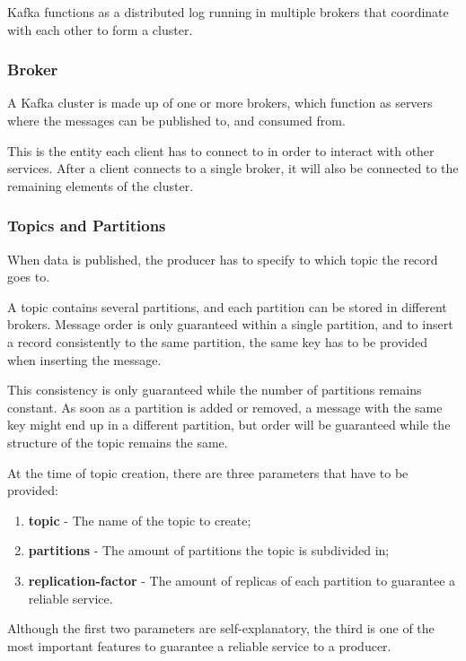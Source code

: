 Kafka functions as a distributed log running in multiple brokers that coordinate with each other to form a cluster.

\subsubsection{Broker}

A Kafka cluster is made up of one or more brokers, which function as servers where the messages can be published to, and consumed from.

This is the entity each client has to connect to in order to interact with other services. After a client connects to a single broker, it will also be connected to the remaining elements of the cluster.

\subsubsection{Topics and Partitions}

When data is published, the producer has to specify to which topic the record goes to. 

A topic contains several partitions, and each partition can be stored in different brokers. Message order is only guaranteed within a single partition, and to insert a record consistently to the same partition, the same key has to be provided when inserting the message. 

This consistency is only guaranteed while the number of partitions remains constant. As soon as a partition is added or removed, a message with the same key might end up in a different partition, but order will be guaranteed while the structure of the topic remains the same.

At the time of topic creation, there are three parameters that have to be provided: 
\begin{enumerate}
    \item \textbf{topic} - The name of the topic to create;
    \item \textbf{partitions} - The amount of partitions the topic is subdivided in;
    \item \textbf{replication-factor} - The amount of replicas of each partition to guarantee a reliable service.
\end{enumerate}

Although the first two parameters are self-explanatory, the third is one of the most important features to guarantee a reliable service to a producer. 

